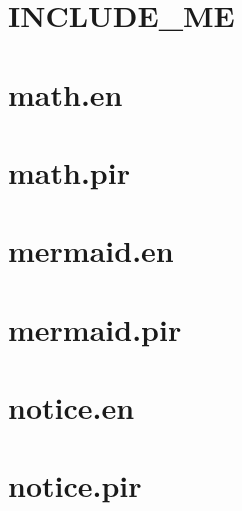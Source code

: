\let\mypdfximage\pdfximage\def\pdfximage{\immediate\mypdfximage}\documentclass[twoside]{book}
\newcommand{\+}{\discretionary{\mbox{\scriptsize$\hookleftarrow$}}{}{}}
\begin{document}
\chapter{INCLUDE\+\_\+\+ME}
\label{md_themes_relearn_exampleSite_content_shortcodes_include_INCLUDE_ME}

\chapter{math.\+en}
\label{md_themes_relearn_exampleSite_content_shortcodes_math_en}

\chapter{math.\+pir}
\label{md_themes_relearn_exampleSite_content_shortcodes_math_pir}

\chapter{mermaid.\+en}
\label{md_themes_relearn_exampleSite_content_shortcodes_mermaid_en}

\chapter{mermaid.\+pir}
\label{md_themes_relearn_exampleSite_content_shortcodes_mermaid_pir}

\chapter{notice.\+en}
\label{md_themes_relearn_exampleSite_content_shortcodes_notice_en}

\chapter{notice.\+pir}
\label{md_themes_relearn_exampleSite_content_shortcodes_notice_pir}

\end{document}
